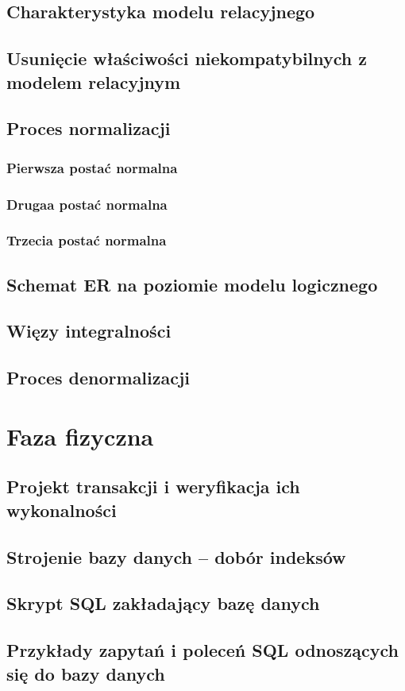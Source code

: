 \documentclass{mwrep}
\begin{document}
\section{Charakterystyka modelu relacyjnego}

\section{Usunięcie właściwości niekompatybilnych z modelem relacyjnym}

\section{Proces normalizacji}

\subsection{Pierwsza postać normalna}
\subsection{Drugaa postać normalna}
\subsection{Trzecia postać normalna}


\section{Schemat ER na poziomie modelu logicznego}

\section{Więzy integralności}

\section{Proces denormalizacji}

\chapter{Faza fizyczna}

\section{Projekt transakcji i weryfikacja ich wykonalności}

\section{Strojenie bazy danych – dobór indeksów}

\section{Skrypt SQL zakładający bazę danych}

\section{Przykłady zapytań i poleceń SQL odnoszących się do bazy danych}
\end{document}
